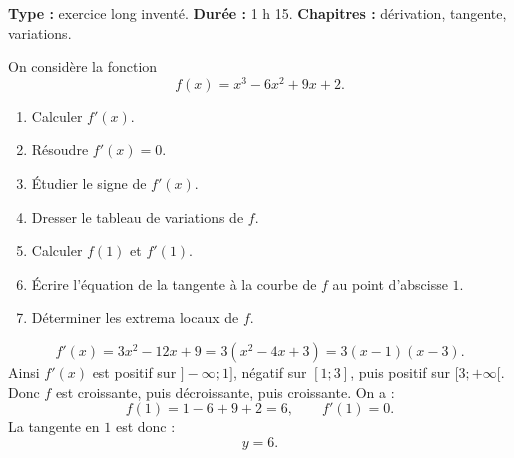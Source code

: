 \documentclass[11pt,a4paper]{article}
\begin{document}
\hypertarget{P-SUJET-04}{}
\begin{sujettype}
\textbf{Type :} exercice long inventé.  
\textbf{Durée :} 1 h 15.  
\textbf{Chapitres :} dérivation, tangente, variations.

On considère la fonction
\[
f(x)=x^3-6x^2+9x+2.
\]

\begin{enumerate}
  \item Calculer $f'(x)$.
  \item Résoudre $f'(x)=0$.
  \item Étudier le signe de $f'(x)$.
  \item Dresser le tableau de variations de $f$.
  \item Calculer $f(1)$ et $f'(1)$.
  \item Écrire l'équation de la tangente à la courbe de $f$ au point d'abscisse $1$.
  \item Déterminer les extrema locaux de $f$.
\end{enumerate}
\end{sujettype}

\begin{corrige}[P-SUJET-04]
\[
f'(x)=3x^2-12x+9=3(x^2-4x+3)=3(x-1)(x-3).
\]
Ainsi $f'(x)$ est positif sur $]-\infty;1]$, négatif sur $[1;3]$, puis positif sur $[3;+\infty[$.  
Donc $f$ est croissante, puis décroissante, puis croissante.  
On a :
\[
f(1)=1-6+9+2=6,
\qquad
f'(1)=0.
\]
La tangente en $1$ est donc :
\[
y=6.
\]
\end{corrige}
\end{document}
